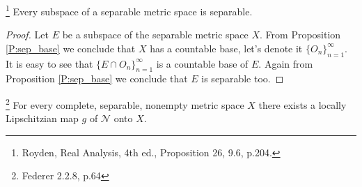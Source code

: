 \begin{proposition} \label{P:sub_sep}
\footnote{Royden, Real Analysis, 4th ed., Proposition 26, 9.6, p.204.} 
Every subspace of a separable metric space is separable.
\end{proposition}
\begin{proof}
Let $E$ be a subspace of the separable metric space $X$. From Proposition
\ref{P:sep_base} we conclude that $X$ has a countable base, let's denote it 
$\{O_n\}_{n=1}^{\infty}$. It is easy to see that 
$\{E\cap O_n\}_{n=1}^{\infty}$ is a countable base of $E$. Again from
Proposition \ref{P:sep_base} we conclude that $E$ is separable too.
\end{proof}

\begin{theorem} \label{T:lipschitz_compltSep}
\footnote{Federer 2.2.8, p.64}
For every complete, separable, nonempty metric space $X$ there exists a locally
Lipschitzian map $g$ of $\mathcal{N}$ onto $X$.
\end{theorem}
